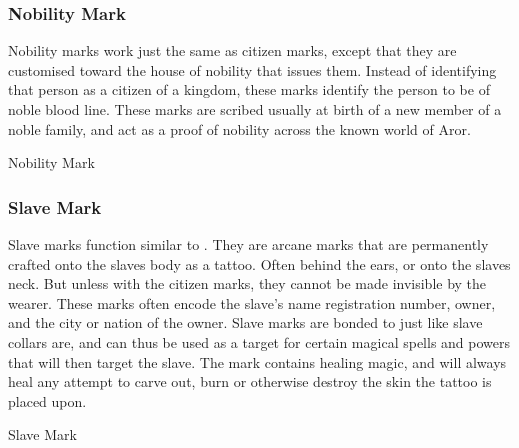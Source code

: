 \subsubsection{Nobility Mark}
\label{sec:Nobility Mark}

Nobility marks work just the same as citizen marks, except that they are
customised toward the house of nobility that issues them. Instead of
identifying that person as a citizen of a kingdom, these marks identify the
person to be of noble blood line. These marks are scribed usually at birth of
a new member of a noble family, and act as a proof of nobility across the
known world of Aror.

\begin{35e}{Nobility Mark}
\end{35e}

\subsubsection{Slave Mark}
\label{sec:Slave Mark}

Slave marks function similar to . They are arcane
marks that are permanently crafted onto the slaves body as a tattoo. Often
behind the ears, or onto the slaves neck. But unless with the citizen marks,
they cannot be made invisible by the wearer. These marks often encode the
slave's name registration number, owner, and the city or nation of the
owner. Slave marks are bonded to  just like slave
collars are, and can thus be used as a target for certain magical spells and
powers that will then target the slave. The mark contains healing magic, and
will always heal any attempt to carve out, burn or otherwise destroy the skin
the tattoo is placed upon.

\begin{35e}{Slave Mark}
\end{35e}

